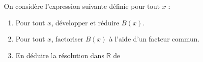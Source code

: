 \begin{exo}
	On considère l'expression suivante définie pour tout $x$ : 

	\begin{enumerate}
		\item Pour tout $x$, développer et réduire $B(x)$.
		\item Pour tout $x$, factoriser $B(x)$ à l'aide d'un facteur commun.
		\item En déduire la résolution dans $\mathbb{R}$ de 
	\end{enumerate}
\end{exo}
